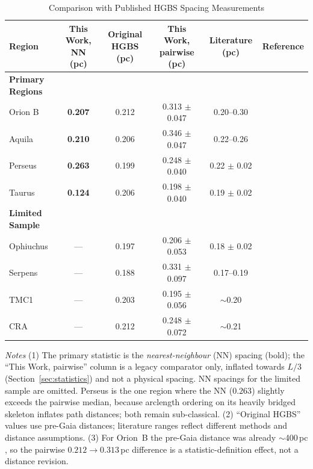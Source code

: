 \documentclass[usenatbib,twoside,twocolumn]{mnras}
\begin{document}
\begin{table}
\caption{Comparison with Published HGBS Spacing Measurements}
\label{tab:literature}
\setlength{\tabcolsep}{4pt}
\begin{tabular}{lccccc}
\toprule
Region & This Work, NN (pc) & Original HGBS (pc) & This Work, pairwise (pc) & Literature (pc) & Reference \\
\midrule
\textbf{Primary Regions} &  &  &  &  &  \\
Orion B & \textbf{0.207} & 0.212 & 0.313 $\pm$ 0.047 & 0.20--0.30 & \citet{Konyves2020} \\
Aquila  & \textbf{0.210} & 0.206 & 0.346 $\pm$ 0.047 & 0.22--0.26 & \citet{Konyves2015} \\
Perseus & \textbf{0.263} & 0.199 & 0.248 $\pm$ 0.040 & 0.22 $\pm$ 0.02 & \citet{Pezzuto2021} \\
Taurus  & \textbf{0.124} & 0.206 & 0.198 $\pm$ 0.040 & 0.19 $\pm$ 0.02 & \citet{Hacar2013} \\
\midrule
\textbf{Limited Sample} &  &  &  &  &  \\
Ophiuchus & --- & 0.197 & 0.206 $\pm$ 0.053 & 0.18 $\pm$ 0.02 & \citet{Konyves2020} \\
Serpens  & --- & 0.188 & 0.331 $\pm$ 0.097 & 0.17--0.19 & \citet{Konyves2020} \\
TMC1     & --- & 0.203 & 0.195 $\pm$ 0.056 & $\sim$0.20 & \citet{Hacar2013} \\
CRA      & --- & 0.212 & 0.248 $\pm$ 0.072 & $\sim$0.21 & \citet{Konyves2020} \\
\bottomrule
\end{tabular}

\vspace{0.1in}
\footnotesize
\emph{Notes} (1) The primary statistic is the \emph{nearest-neighbour} (NN) spacing (bold); the ``This Work, pairwise'' column is a legacy comparator only, inflated towards $L/3$ (Section~\ref{sec:statistics}) and not a physical spacing. NN spacings for the limited sample are omitted. Perseus is the one region where the NN ($0.263$) slightly exceeds the pairwise median, because arclength ordering on its heavily bridged skeleton inflates path distances; both remain sub-classical. (2) ``Original HGBS'' values use pre-Gaia distances; literature ranges reflect different methods and distance assumptions. (3) For Orion~B the pre-Gaia distance was already $\sim$400\,pc \citep{Konyves2020}, so the pairwise $0.212\to0.313$\,pc difference is a statistic-definition effect, not a distance revision.
\end{table}
\end{document}
